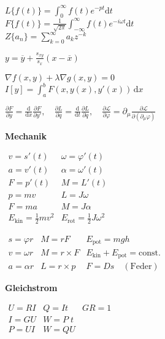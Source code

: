 \documentclass[a4paper,10pt,fleqn,twocolumn,twoside,dvipdfmx]{article}
\newcommand{\ds}{\displaystyle}
\begin{document}
$\ds L\{f(t)\} = \int_0^{\infty} f(t)e^{-pt}\mathrm dt$\\
$\ds F\{f(t)\} = \frac{1}{\sqrt{2\pi}}\int_{-\infty}^{\infty}
f(t)e^{-i\omega t}\mathrm dt$\\
$\ds Z\{a_n\} = \sum_{k=0}^\infty a_k z^{-k}$

$\ds y = \overline y + \frac{s_{xy}}{s_x}(x-\overline x)$

$\nabla f(x,y) + \lambda\nabla g(x,y)=0$\\
$I[y]=\ds\int_a^b F(x,y(x),y'(x))\,\mathrm dx$

$\ds \frac{\partial F}{\partial y}
=\frac{\mathrm d}{\mathrm dx} \frac{\partial F}{\partial y'},\quad
\ds \frac{\partial L}{\partial q}
=\frac{\mathrm d}{\mathrm dt} \frac{\partial L}{\partial\dot q},\quad
\ds \frac{\partial\mathcal L}{\partial\varphi}
=\partial_\mu \frac{\partial\mathcal L}{\partial(\partial_\mu\varphi)}$


\newpage


\textbf{Mechanik}

${}\!\!\!\begin{array}{l|l}
v = s'(t) & \omega = \varphi'(t)\\
a = v'(t) & \alpha = \omega'(t)\\
F = p'(t) & M = L'(t)\\
p = mv & L = J\omega\\
F = ma & M = J\alpha\\
E_\mathrm{kin} = \frac{1}{2}mv^2
& E_\mathrm{rot} = \frac{1}{2}J\omega^2
\end{array}$

${}\!\!\!\begin{array}{l|l|l}
s=\varphi r& M=rF & E_\mathrm{pot} = mgh\\
v=\omega r & M=r\times F & E_\mathrm{kin}+E_\mathrm{pot} = \mathrm{const.}\\
a=\alpha r& L=r\times p & F = Ds\quad \mathrm{(Feder)}
\end{array}$



\textbf{Gleichstrom}

${}\!\!\!\begin{array}{l|l|l}
U=RI & Q=It & GR=1\\
I=GU & W=P\;\!t\\
P=UI & W=QU\\
\end{array}$
\end{document}
